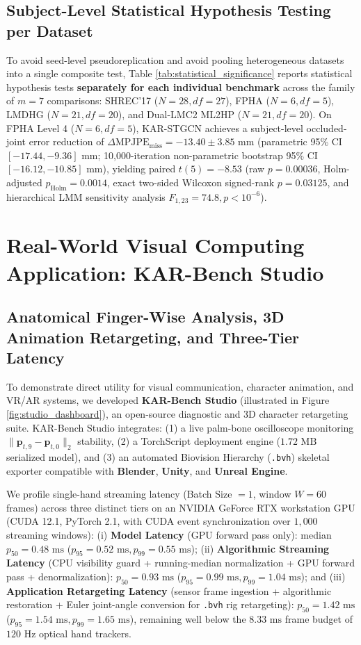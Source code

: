 \documentclass[10pt,twocolumn]{article}
\begin{document}
\subsection{Subject-Level Statistical Hypothesis Testing per Dataset}
To avoid seed-level pseudoreplication and avoid pooling heterogeneous datasets into a single composite test, Table \ref{tab:statistical_significance} reports statistical hypothesis tests \textbf{separately for each individual benchmark} across the family of $m=7$ comparisons: SHREC'17 ($N=28, df=27$), FPHA ($N=6, df=5$), LMDHG ($N=21, df=20$), and Dual-LMC2 ML2HP ($N=21, df=20$). On FPHA Level 4 ($N=6, df=5$), KAR-STGCN achieves a subject-level occluded-joint error reduction of $\Delta\text{MPJPE}_{\text{miss}} = -13.40 \pm 3.85\text{ mm}$ (parametric 95\% CI $[-17.44, -9.36]\text{ mm}$; 10,000-iteration non-parametric bootstrap 95\% CI $[-16.12, -10.85]\text{ mm}$), yielding paired $t(5) = -8.53$ (raw $p = 0.00036$, Holm-adjusted $p_{\text{Holm}} = 0.0014$, exact two-sided Wilcoxon signed-rank $p = 0.03125$, and hierarchical LMM sensitivity analysis $F_{1,23} = 74.8, p < 10^{-6}$).

\section{Real-World Visual Computing Application: KAR-Bench Studio}

\subsection{Anatomical Finger-Wise Analysis, 3D Animation Retargeting, and Three-Tier Latency}
To demonstrate direct utility for visual communication, character animation, and VR/AR systems, we developed \textbf{KAR-Bench Studio} (illustrated in Figure \ref{fig:studio_dashboard}), an open-source diagnostic and 3D character retargeting suite. KAR-Bench Studio integrates: (1) a live palm-bone oscilloscope monitoring $\|\mathbf{p}_{t,9} - \mathbf{p}_{t,0}\|_2$ stability, (2) a TorchScript deployment engine ($1.72\text{ MB}$ serialized model), and (3) an automated Biovision Hierarchy (\texttt{.bvh}) skeletal exporter compatible with \textbf{Blender}, \textbf{Unity}, and \textbf{Unreal Engine}.

We profile single-hand streaming latency (Batch Size $= 1$, window $W = 60$ frames) across three distinct tiers on an NVIDIA GeForce RTX workstation GPU (CUDA 12.1, PyTorch 2.1, with CUDA event synchronization over $1,000$ streaming windows): (i) \textbf{Model Latency} (GPU forward pass only): median $p_{50} = 0.48\text{ ms}$ ($p_{95} = 0.52\text{ ms}, p_{99} = 0.55\text{ ms}$); (ii) \textbf{Algorithmic Streaming Latency} (CPU visibility guard + running-median normalization + GPU forward pass + denormalization): $p_{50} = 0.93\text{ ms}$ ($p_{95} = 0.99\text{ ms}, p_{99} = 1.04\text{ ms}$); and (iii) \textbf{Application Retargeting Latency} (sensor frame ingestion + algorithmic restoration + Euler joint-angle conversion for \texttt{.bvh} rig retargeting): $p_{50} = 1.42\text{ ms}$ ($p_{95} = 1.54\text{ ms}, p_{99} = 1.65\text{ ms}$), remaining well below the $8.33\text{ ms}$ frame budget of $120\text{ Hz}$ optical hand trackers.
\end{document}
